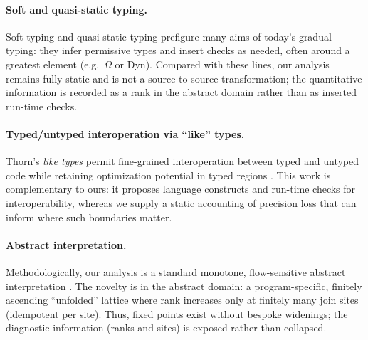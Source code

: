 \paragraph{Soft and quasi-static typing.}
Soft typing \cite{CartwrightFagan1991} and quasi-static typing \cite{Thatte1990} prefigure many aims of today’s gradual typing: they infer permissive types and insert checks as needed, often around a greatest element (e.g.\ $\Omega$ or \textsf{Dyn}). Compared with these lines, our analysis remains fully static and is not a source-to-source transformation; the quantitative information is recorded as a rank in the abstract domain rather than as inserted run-time checks.

\paragraph{Typed/untyped interoperation via “like” types.}
Thorn’s \emph{like types} permit fine-grained interoperation between typed and untyped code while retaining optimization potential in typed regions \cite{WrigstadEtAl2010}. This work is complementary to ours: it proposes language constructs and run-time checks for interoperability, whereas we supply a static accounting of precision loss that can inform where such boundaries matter.

\paragraph{Abstract interpretation.}
Methodologically, our analysis is a standard monotone, flow-sensitive abstract interpretation \cite{CousotCousot1977}. The novelty is in the abstract domain: a program-specific, finitely ascending “unfolded” lattice where rank increases only at finitely many join sites (idempotent per site). Thus, fixed points exist without bespoke widenings; the diagnostic information (ranks and sites) is exposed rather than collapsed.
